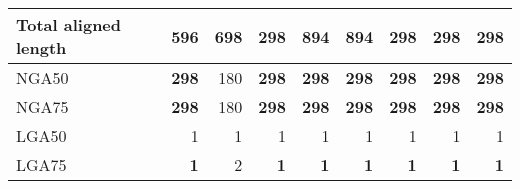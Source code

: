 \documentclass[12pt,a4paper]{article}
\begin{document}
\begin{table}[ht]
\begin{center}
\begin{tabular}{|l*{8}{|r}|}
Total aligned length & 596 & 698 & 298 & {\bf 894} & {\bf 894} & 298 & 298 & 298 \\ \hline
NGA50 & {\bf 298} & 180 & {\bf 298} & {\bf 298} & {\bf 298} & {\bf 298} & {\bf 298} & {\bf 298} \\ \hline
NGA75 & {\bf 298} & 180 & {\bf 298} & {\bf 298} & {\bf 298} & {\bf 298} & {\bf 298} & {\bf 298} \\ \hline
LGA50 & 1 & 1 & 1 & 1 & 1 & 1 & 1 & 1 \\ \hline
LGA75 & {\bf 1} & 2 & {\bf 1} & {\bf 1} & {\bf 1} & {\bf 1} & {\bf 1} & {\bf 1} \\ \hline
\end{tabular}
\end{center}
\end{table}
\end{document}
